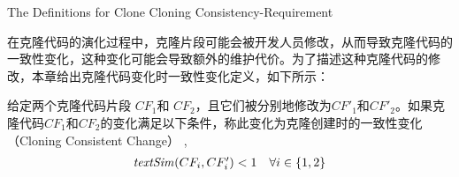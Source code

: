 




{The Definitions for Clone Cloning Consistency-Requirement}

在克隆代码的演化过程中，克隆片段可能会被开发人员修改，从而导致克隆代码的一致性变化，这种变化可能会导致额外的维护代价。为了描述这种克隆代码的修改，本章给出克隆代码变化时一致性变化定义，如下所示：

\begin{definition}  
\label{def-cloningchange}
给定两个克隆代码片段 $CF_1$和 $CF_2$，且它们被分别地修改为$CF'_1$和$CF'_2$。如果克隆代码$CF_1$和$CF_2$的变化满足以下条件，称此变化为{克隆创建时的一致性变化（Cloning Consistent Change）} , 
  \[
  \begin{array}[t]{cr}
    \mathit{textSim}(CF_i, CF'_i) < 1 & \forall i \in \{1,2\}  \\
  \end{array}
  \]
\end{definition}

